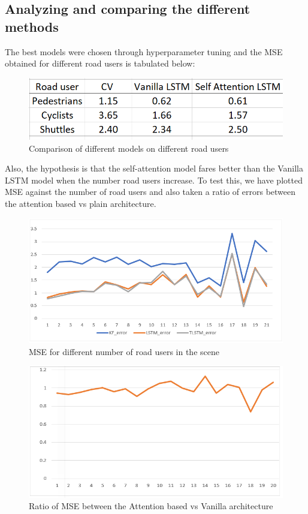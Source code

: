 \documentclass{article}
\begin{document}
\subsection{Analyzing and comparing the different methods}
The best models were chosen through hyperparameter tuning and the MSE obtained for different road users is tabulated below:
\begin{figure}[H]
\centering
\includegraphics[scale=0.6]{result/res3.png}
\caption{Comparison of different models on different road users}
\end{figure}
Also, the hypothesis is that the self-attention model fares better than the Vanilla LSTM model when the number road users increase. To test this, we have plotted MSE against the number of road users and also taken a ratio of errors between the attention based vs plain architecture. 
\begin{figure}[H]
\centering
\includegraphics[scale=0.6]{result/res4.png}
\caption{MSE for different number of road users in the scene}
\end{figure}

\begin{figure}[H]
\centering
\includegraphics[scale=0.6]{result/res5.png}
\caption{Ratio of MSE between the Attention based vs Vanilla architecture}
\end{figure}
\end{document}

